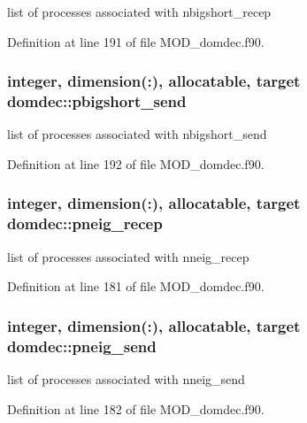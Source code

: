 list of processes associated with nbigshort\-\_\-recep 



Definition at line 191 of file M\-O\-D\-\_\-domdec.\-f90.

\hypertarget{classdomdec_a3de9da3bc58ffb96711e59d730a60f28}{
\subsubsection[{pbigshort\-\_\-send}]{\setlength{\rightskip}{0pt plus 5cm}integer, dimension(\-:), allocatable, target domdec\-::pbigshort\-\_\-send}}\label{classdomdec_a3de9da3bc58ffb96711e59d730a60f28}


list of processes associated with nbigshort\-\_\-send 



Definition at line 192 of file M\-O\-D\-\_\-domdec.\-f90.

\hypertarget{classdomdec_a720905850ac4cc7d180e0b6eb9a32c5d}{
\subsubsection[{pneig\-\_\-recep}]{\setlength{\rightskip}{0pt plus 5cm}integer, dimension(\-:), allocatable, target domdec\-::pneig\-\_\-recep}}\label{classdomdec_a720905850ac4cc7d180e0b6eb9a32c5d}


list of processes associated with nneig\-\_\-recep 



Definition at line 181 of file M\-O\-D\-\_\-domdec.\-f90.

\hypertarget{classdomdec_a2b90bf1f406fc3b495a131fb93aae791}{
\subsubsection[{pneig\-\_\-send}]{\setlength{\rightskip}{0pt plus 5cm}integer, dimension(\-:), allocatable, target domdec\-::pneig\-\_\-send}}\label{classdomdec_a2b90bf1f406fc3b495a131fb93aae791}


list of processes associated with nneig\-\_\-send 



Definition at line 182 of file M\-O\-D\-\_\-domdec.\-f90.

